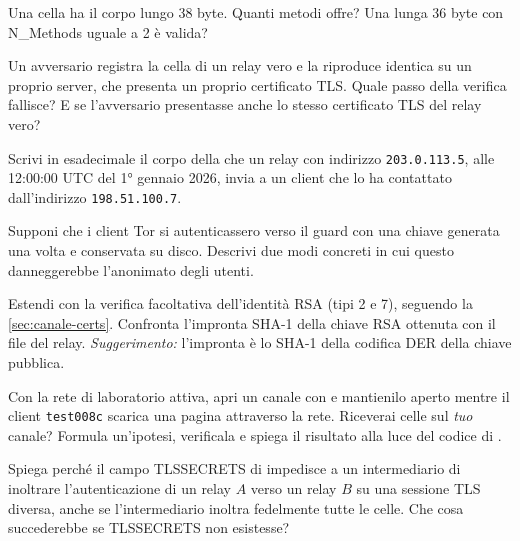 \begin{esercizio}[1]\label{es:07-authchallenge}
Una cella  ha il corpo lungo 38 byte. Quanti metodi offre? Una lunga 36 byte con N\_Methods uguale a 2 è valida?
\end{esercizio}

\begin{esercizio}[2]\label{es:07-impostore}
Un avversario registra la cella  di un relay vero e la riproduce identica su un proprio server, che presenta un proprio certificato TLS. Quale passo della verifica fallisce? E se l'avversario presentasse anche lo stesso certificato TLS del relay vero?
\end{esercizio}

\begin{esercizio}[2]\label{es:07-netinfo}
Scrivi in esadecimale il corpo della  che un relay con indirizzo \texttt{203.0.113.5}, alle 12:00:00 UTC del 1° gennaio 2026, invia a un client che lo ha contattato dall'indirizzo \texttt{198.51.100.7}.
\end{esercizio}

\begin{esercizio}[2]\label{es:07-client-auth}
Supponi che i client Tor si autenticassero verso il guard con una chiave generata una volta e conservata su disco. Descrivi due modi concreti in cui questo danneggerebbe l'anonimato degli utenti.
\end{esercizio}

\begin{esercizio}[2]\label{es:07-rsa}
Estendi  con la verifica facoltativa dell'identità RSA (tipi 2 e 7), seguendo la \cref{sec:canale-certs}. Confronta l'impronta SHA-1 della chiave RSA ottenuta con il file  del relay. \emph{Suggerimento:} l'impronta è lo SHA-1 della codifica DER della chiave pubblica.
\end{esercizio}

\begin{esercizio}[3]\label{es:07-padding}
Con la rete di laboratorio attiva, apri un canale con  e mantienilo aperto mentre il client \texttt{test008c} scarica una pagina attraverso la rete. Riceverai celle  sul \emph{tuo} canale? Formula un'ipotesi, verificala e spiega il risultato alla luce del codice di .
\end{esercizio}

\begin{esercizio}[3]\label{es:07-mitm}
Spiega perché il campo TLSSECRETS di  impedisce a un intermediario di inoltrare l'autenticazione di un relay $A$ verso un relay $B$ su una sessione TLS diversa, anche se l'intermediario inoltra fedelmente tutte le celle. Che cosa succederebbe se TLSSECRETS non esistesse?
\end{esercizio}

